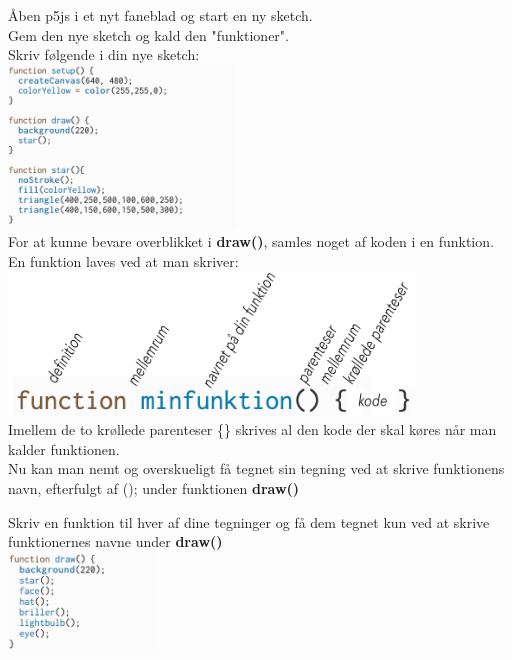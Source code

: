 \documentclass{ucph-handout}
\begin{document}
\begin{exercisebox}[adjusted title=Funktioner]

Åben p5js i et nyt faneblad og start en ny sketch.\\

Gem den nye sketch og kald den "funktioner".\\

Skriv følgende i din nye sketch:\\

\quad\quad\includegraphics[width=0.45\textwidth]{nyebilleder/starfunktion.png} \\

For at kunne bevare overblikket i  \textbf{draw()}, samles noget af koden i en funktion.\\

En funktion laves ved at man skriver:\\ 

\includegraphics[width=0.8\textwidth]{nyebilleder/kodefunktion.jpg} \\

Imellem de to krøllede parenteser \{\} skrives al den kode der skal køres når man kalder funktionen. \\


Nu kan man nemt og overskueligt få tegnet sin tegning ved at skrive funktionens navn, efterfulgt af (); under funktionen \textbf{draw()} \\


\vspace{3mm}

\noindent
{}

\vspace{3mm}
Skriv en funktion til hver af dine tegninger og få dem tegnet kun ved at skrive funktionernes navne under \textbf{draw()}  \\

\quad\quad\includegraphics[width=0.3\textwidth]{nyebilleder/liste.png}

\end{exercisebox}
\end{document}
